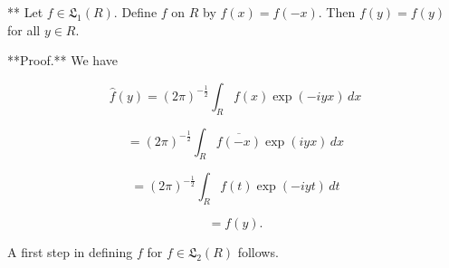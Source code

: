 ** Let $f \in \mathfrak{L}_1(R)$. Define $f$ on $R$ by $f(x) = f(-x)$. Then $f(y) = f(y)$ for all $y \in R$.

**Proof.** We have

$$\hat{f}(y) = \left(2\pi\right)^{-\frac{1}{2}} \int_{R} f(x) \exp(-iyx) \, dx$$

$$= \left(2\pi\right)^{-\frac{1}{2}} \int_{R} \overline{f(-x)} \exp(iyx) \, dx$$

$$= \left(2\pi\right)^{-\frac{1}{2}} \int_{R} f(t) \exp(-iyt) \, dt$$

$$= f(y).$$

A first step in defining $f$ for $f \in \mathfrak{L}_2(R)$ follows.